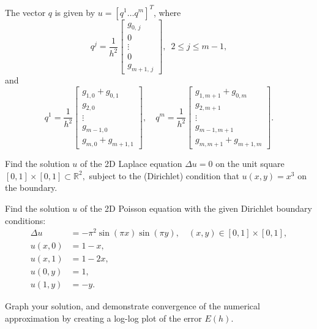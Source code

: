 The vector $q$ is given by $u = [q^1 \ldots q^m]^T$, where 
\[
q^j = \frac{1}{h^2}
\begin{bmatrix} g_{0,\,j} \\ 0 \\ \vdots \\0\\ g_{m+1,\,j} \end{bmatrix} , \,\,\, 2 \leq j \leq m-1,
\]
and 
\[
q^1 = \frac{1}{h^2}\begin{bmatrix} g_{1,0} + g_{0,1} \\ g_{2,0} \\ \vdots \\ g_{m-1,0}\\ g_{m,0} + g_{m+1,1}\end{bmatrix}, \quad q^m = \frac{1}{h^2}\begin{bmatrix} g_{1,m+1} + g_{0,m}\\ g_{2,m+1} \\ \vdots \\ g_{m-1,m+1}\\ g_{m,m+1} + g_{m+1,m}\end{bmatrix}.
\]

\begin{problem}
	Find the solution $u$ of the 2D Laplace equation $\Delta u = 0$ on the unit 
	square $[0,1]\times [0,1] \subset \mathbb{R}^2,$ subject to the (Dirichlet) condition that 
	$u(x,y) = x^3$ on the boundary. 
\end{problem}

\begin{problem}
	Find the solution $u$ of the 2D Poisson equation with the given Dirichlet boundary conditions:
	\begin{align*}
		\Delta u &= -\pi^2 \sin(\pi x)\sin(\pi y), \quad (x,y) \in [0,1]\times [0,1], \\
		u(x,0) &= 1-x, \\
		u(x,1) &= 1-2x, \\
		u(0,y) &= 1, \\
		u(1,y) &= -y. 
	\end{align*}
	
	Graph your solution, and demonstrate convergence of the numerical approximation by 
	creating a log-log plot of the error $E(h).$
\end{problem}

